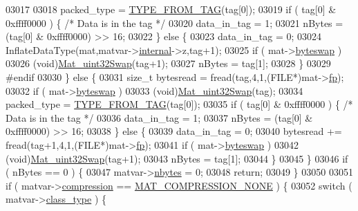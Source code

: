 \begin{DoxyCode}
{{{{{{{{{{{{{{{{03017 
03018         packed\_type = \hyperlink{mat5_8c_a82bacecc4afc633b61bc3dc8ef88d1ed}{TYPE\_FROM\_TAG}(tag[0]);
03019         \textcolor{keywordflow}{if} ( tag[0] & 0xffff0000 ) \{ \textcolor{comment}{/* Data is in the tag */}
03020             data\_in\_tag = 1;
03021             nBytes = (tag[0] & 0xffff0000) >> 16;
03022         \} \textcolor{keywordflow}{else} \{
03023             data\_in\_tag = 0;
03024             InflateDataType(mat,matvar->\hyperlink{group___m_a_t_a6e97e3ed9f40c49322c18561c2a94e92}{internal}->z,tag+1);
03025             \textcolor{keywordflow}{if} ( mat->\hyperlink{struct__mat__t_a99d207977af5e04941ace56d71817a40}{byteswap} )
03026                 (void)\hyperlink{endian_8c_a8cb0d0750e2eaf9840d95db531934f4f}{Mat\_uint32Swap}(tag+1);
03027             nBytes = tag[1];
03028         \}
03029 \textcolor{preprocessor}{#endif}
03030     \} \textcolor{keywordflow}{else} \{
03031         \textcolor{keywordtype}{size\_t} bytesread = fread(tag,4,1,(FILE*)mat->\hyperlink{struct__mat__t_a85f562e407ca9ad4d2a6e14f839432b7}{fp});
03032         \textcolor{keywordflow}{if} ( mat->\hyperlink{struct__mat__t_a99d207977af5e04941ace56d71817a40}{byteswap} )
03033             (void)\hyperlink{endian_8c_a8cb0d0750e2eaf9840d95db531934f4f}{Mat\_uint32Swap}(tag);
03034         packed\_type = \hyperlink{mat5_8c_a82bacecc4afc633b61bc3dc8ef88d1ed}{TYPE\_FROM\_TAG}(tag[0]);
03035         \textcolor{keywordflow}{if} ( tag[0] & 0xffff0000 ) \{ \textcolor{comment}{/* Data is in the tag */}
03036             data\_in\_tag = 1;
03037             nBytes = (tag[0] & 0xffff0000) >> 16;
03038         \} \textcolor{keywordflow}{else} \{
03039             data\_in\_tag = 0;
03040             bytesread += fread(tag+1,4,1,(FILE*)mat->\hyperlink{struct__mat__t_a85f562e407ca9ad4d2a6e14f839432b7}{fp});
03041             \textcolor{keywordflow}{if} ( mat->\hyperlink{struct__mat__t_a99d207977af5e04941ace56d71817a40}{byteswap} )
03042                 (void)\hyperlink{endian_8c_a8cb0d0750e2eaf9840d95db531934f4f}{Mat\_uint32Swap}(tag+1);
03043             nBytes = tag[1];
03044         \}
03045     \}
03046     \textcolor{keywordflow}{if} ( nBytes == 0 ) \{
03047         matvar->\hyperlink{group___m_a_t_abf1c844540503be2df9bb3db93cfe307}{nbytes} = 0;
03048         \textcolor{keywordflow}{return};
03049     \}
03050 
03051     \textcolor{keywordflow}{if} ( matvar->\hyperlink{group___m_a_t_aeef0466048621cb2c959ba7f6c774d06}{compression} == \hyperlink{group___m_a_t_gga768c318af97bd2567758ecb001ceb7f4a2280b97631ff5dd24dec55261dc587b6}{MAT\_COMPRESSION\_NONE} ) \{
03052         \textcolor{keywordflow}{switch} ( matvar->\hyperlink{group___m_a_t_aff13035bf3265dd7d9425e5d40c839d4}{class\_type} ) \{
}}}}}}}}}}}}}}}}
\end{DoxyCode}
